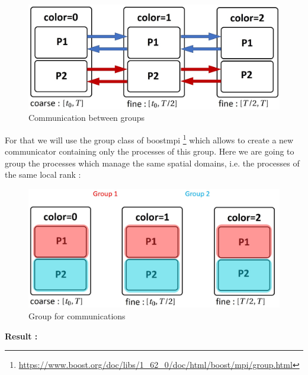 \begin{figure}[H]
	\centering
	\includegraphics[width=0.7\linewidth]{"images/parareal/feelpp/master_slave_comm.jpg"}
	\caption{Communication between groups}
\end{figure}
\noindent For that we will use the group class of boostmpi \footnote[1]{\url{https://www.boost.org/doc/libs/1_62_0/doc/html/boost/mpi/group.html}} which allows to create a new communicator containing only the processes of this group. Here we are going to group the processes which manage the same spatial domains, i.e. the processes of the same local rank :
\begin{figure}[H]
	\centering
	\includegraphics[width=0.7\linewidth]{"images/parareal/feelpp/master_slave_group.jpg"}
	\caption{Group for communications}
\end{figure}

\noindent \textbf{Result :}

